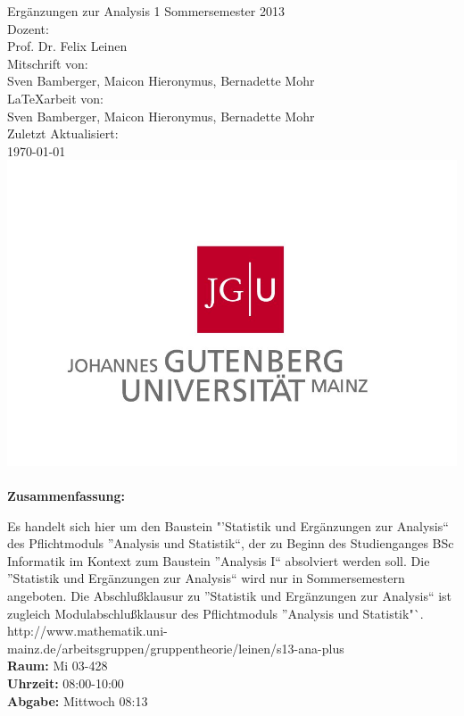\begin{titlepage}
\center
\Large Ergänzungen zur Analysis 1 Sommersemester 2013\large \\[2em]
Dozent:\\Prof. Dr. Felix Leinen\\[2em]
Mitschrift von:\\Sven Bamberger, Maicon Hieronymus, Bernadette Mohr\\[2em]
\LaTeX{arbeit} von:\\Sven Bamberger, Maicon Hieronymus, Bernadette Mohr\\[2em]
Zuletzt Aktualisiert:\\\today\\
\includegraphics[scale=.2]{front/pics/Logo.jpg}\\\quad\\
\Large \textbf{Zusammenfassung:}\\[1em]
\parbox{0.75\textwidth}{\large
Es handelt sich hier um den Baustein "'Statistik und Ergänzungen zur Analysis"` des Pflichtmoduls "'Analysis und Statistik"`, der zu Beginn des Studienganges BSc Informatik im Kontext zum Baustein "'Analysis I"` absolviert werden soll.  Die "'Statistik und Ergänzungen zur Analysis"` wird nur in Sommersemestern angeboten.  Die Abschlußklausur zu "'Statistik und Ergänzungen zur Analysis"` ist zugleich Modulabschlußklausur des Pflichtmoduls "'Analysis und Statistik"`.\\
http://www.mathematik.uni-mainz.de/arbeitsgruppen/gruppentheorie/leinen/s13-ana-plus\\
\textbf{Raum:} Mi 03-428\\
\textbf{Uhrzeit:} 08:00-10:00\\
\textbf{Abgabe:} Mittwoch 08:13\\
}
\end{titlepage}